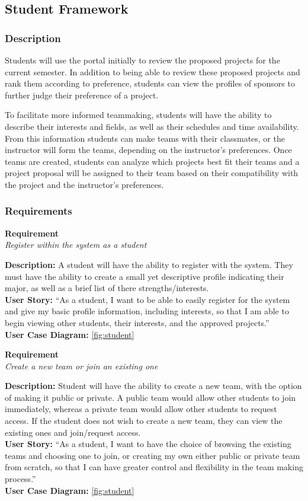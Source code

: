 \documentclass[12pt]{article}
\newcommand{\requirement}[4] {
		\noindent
		\begin{center}\textbf{Requirement\\}\textit{#1}\\\end{center}
		\textbf{Description:} #2\\
		\textbf{User Story:} ``#3''\\
		\textbf{User Case Diagram:} #4\\
}
\begin{document}
\subsection{Student Framework}

\subsubsection{Description}

Students will use the portal initially to review the proposed projects for the current semester. In addition to being able to review these proposed projects and rank them according to preference, students can view the profiles of sponsors to further judge their preference of a project.

To facilitate more informed teammaking, students will have the ability to describe their interests and fields, as well as their schedules and time availability. From this information students can make teams with their classmates, or the instructor will form the teams, depending on the instructor’s preferences.
Once teams are created, students can analyze which projects best fit their teams and a project proposal will be assigned to their team based on their compatibility with the project and the instructor’s preferences.

\subsubsection{Requirements}

\requirement{Register within the system as a student}
			{A student will have the ability to register with the system. They must have the ability to create a small yet descriptive profile indicating their major, as well as a brief list of there strengths/interests.}
			{As a student, I want to be able to easily register for the system and give my basic profile information, including interests, so that I am able to begin viewing other students, their interests, and the approved projects.}
			{\autoref{fig:student}}

\requirement{Create a new team or join an existing one}
			{Student will have the ability to create a new team, with the option of making it public or private. A public team would allow other students to join immediately, whereas a private team would allow other students to request access. If the student does not wish to create a new team, they can view the existing ones and join/request access.}
			{As a student, I want to have the choice of browsing the existing teams and choosing one to join, or creating my own either public or private team from scratch, so that I can have greater control and flexibility in the team making process.}
			{\autoref{fig:student}}
\end{document}
